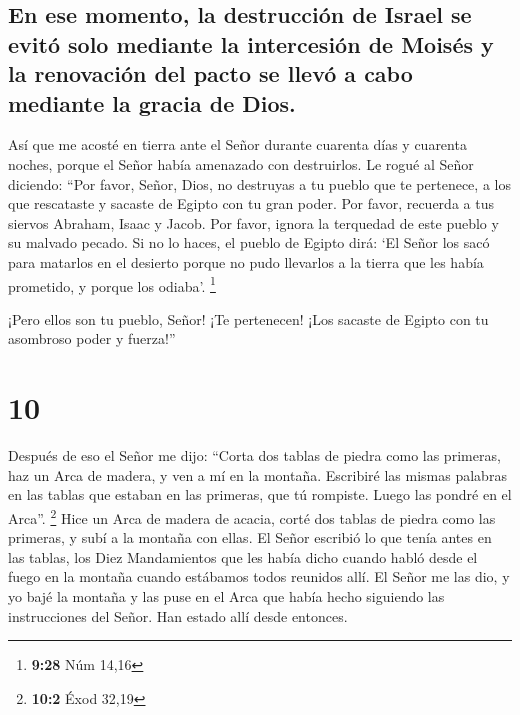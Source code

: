 \hypertarget{en-ese-momento-la-destrucciuxf3n-de-israel-se-evituxf3-solo-mediante-la-intercesiuxf3n-de-moisuxe9s-y-la-renovaciuxf3n-del-pacto-se-llevuxf3-a-cabo-mediante-la-gracia-de-dios.}{%
\subsection{En ese momento, la destrucción de Israel se evitó solo
mediante la intercesión de Moisés y la renovación del pacto se llevó a
cabo mediante la gracia de
Dios.}\label{en-ese-momento-la-destrucciuxf3n-de-israel-se-evituxf3-solo-mediante-la-intercesiuxf3n-de-moisuxe9s-y-la-renovaciuxf3n-del-pacto-se-llevuxf3-a-cabo-mediante-la-gracia-de-dios.}}

 Así que me acosté en tierra ante el Señor durante
cuarenta días y cuarenta noches, porque el Señor había amenazado con
destruirlos.  Le rogué al Señor diciendo: ``Por favor,
Señor, Dios, no destruyas a tu pueblo que te pertenece, a los que
rescataste y sacaste de Egipto con tu gran poder.  Por
favor, recuerda a tus siervos Abraham, Isaac y Jacob. Por favor, ignora
la terquedad de este pueblo y su malvado pecado.  Si no
lo haces, el pueblo de Egipto dirá: `El Señor los sacó para matarlos en
el desierto porque no pudo llevarlos a la tierra que les había
prometido, y porque los odiaba'. \footnote{\textbf{9:28} Núm 14,16}

 ¡Pero ellos son tu pueblo, Señor! ¡Te pertenecen! ¡Los
sacaste de Egipto con tu asombroso poder y fuerza!''

\hypertarget{section-9}{%
\section{10}\label{section-9}}

 Después de eso el Señor me dijo: ``Corta dos tablas de
piedra como las primeras, haz un Arca de madera, y ven a mí en la
montaña.  Escribiré las mismas palabras en las tablas que
estaban en las primeras, que tú rompiste. Luego las pondré en el Arca''.
\footnote{\textbf{10:2} Éxod 32,19}  Hice un Arca de
madera de acacia, corté dos tablas de piedra como las primeras, y subí a
la montaña con ellas.  El Señor escribió lo que tenía
antes en las tablas, los Diez Mandamientos que les había dicho cuando
habló desde el fuego en la montaña cuando estábamos todos reunidos allí.
El Señor me las dio,  y yo bajé la montaña y las puse en
el Arca que había hecho siguiendo las instrucciones del Señor. Han
estado allí desde entonces.

